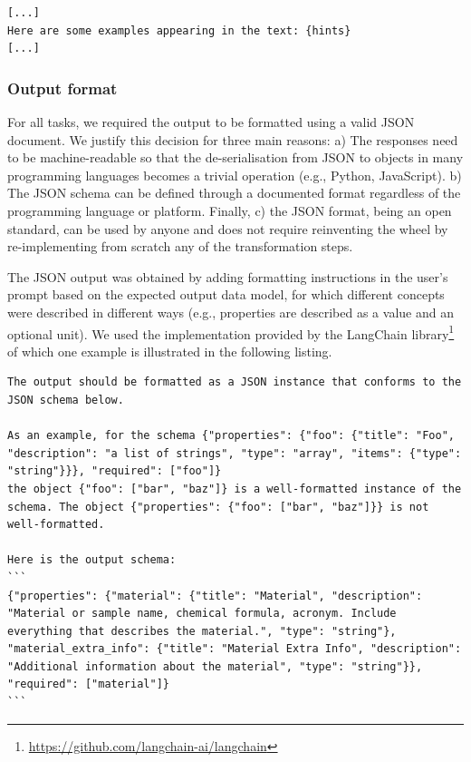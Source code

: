 \begin{lstlisting}[caption=Few-shot prompting modified prompt template.]
[...]
Here are some examples appearing in the text: {hints}
[...]
\end{lstlisting}

\subsubsection{Output format}
\label{subsubsec:output-format}

For all tasks, we required the output to be formatted using a valid JSON document. 
We justify this decision for three main reasons: 
a) The responses need to be machine-readable so that the de-serialisation from JSON to objects in many programming languages becomes a trivial operation (e.g., Python, JavaScript).
b) The JSON schema can be defined through a documented format regardless of the programming language or platform. 
Finally, c) the JSON format, being an open standard, can be used by anyone and does not require reinventing the wheel by re-implementing from scratch any of the transformation steps.

The JSON output was obtained by adding formatting instructions in the user's prompt based on the expected output data model, for which different concepts were described in different ways (e.g., properties are described as a value and an optional unit).
We used the implementation provided by the LangChain library\footnote{\url{https://github.com/langchain-ai/langchain}} of which one example is illustrated in the following listing. 

\begin{lstlisting}[caption=Example of formatting instruction to a valid JSON format]
The output should be formatted as a JSON instance that conforms to the JSON schema below.

As an example, for the schema {"properties": {"foo": {"title": "Foo", "description": "a list of strings", "type": "array", "items": {"type": "string"}}}, "required": ["foo"]}
the object {"foo": ["bar", "baz"]} is a well-formatted instance of the schema. The object {"properties": {"foo": ["bar", "baz"]}} is not well-formatted.

Here is the output schema:
```
{"properties": {"material": {"title": "Material", "description": "Material or sample name, chemical formula, acronym. Include everything that describes the material.", "type": "string"}, "material_extra_info": {"title": "Material Extra Info", "description": "Additional information about the material", "type": "string"}}, "required": ["material"]}
```
\end{lstlisting}

